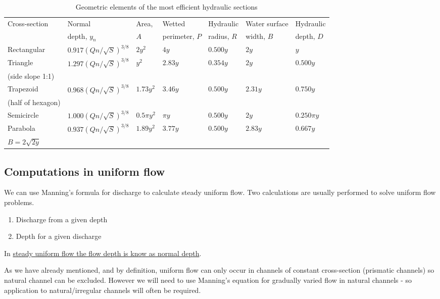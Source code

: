 \documentclass[a4paper, 12pt, british]{article} %
\numberwithin{equation}{section}
\numberwithin{figure}{section}
\numberwithin{table}{section}
\begin{document}
\begin{table}[H]
	\centering
	\begin{tabular}{ l llllll }
		\hline
		Cross-section & Normal & Area,  & Wetted  & Hydraulic  & Water surface  & Hydraulic \\
		& depth, $y_n$ & $A$ & perimeter, $P$ & radius, $R$ &  width, $B$ & depth, $D$\\
		\hline 
		Rectangular & $0.917 (Qn/\sqrt{S})^{3/8}$ & $2y^2$ & $4y$ & $0.500 y$ & $2y$ & $y$\\
		Triangle & $1.297 (Qn/\sqrt{S})^{3/8}$ & $y^2$ & $2.83 y$ & $0.354 y$ & $2y$ & $0.500y$\\
		(side slope 1:1) &  &  &  &  &   & \\
		Trapezoid  & $0.968 (Qn/\sqrt{S})^{3/8}$ & $1.73 y^2$ & $3.46 y$ & $0.500 y$ & $2.31 y$ & $0.750 y$\\
		(half of hexagon)  &  &  &  &  &   & \\
		Semicircle & $1.000 (Qn/\sqrt{S})^{3/8}$ &  $0.5\pi y^2$ & $\pi y$ & $0.500y$ & $2y$ & $0.250 \pi y$ \\
		Parabola  & $0.937 (Qn/\sqrt{S})^{3/8}$ & $1.89 y^2$ & $3.77 y$ & $0.500 y$ & $2.83 y$ & $0.667 y$\\
		$B  =  2\sqrt{2y}$ &  &  &  &  &  &   \\
		\hline
	\end{tabular}
	\caption{Geometric elements of the most efficient
		hydraulic sections \cite{french94}}
	\label{tab:1281}
\end{table}


\subsection{Computations in uniform flow}

We can use Manning's formula for discharge to calculate steady uniform flow. Two calculations are usually performed to solve uniform flow problems.
\begin{enumerate}
	\item Discharge from a given depth
	\item Depth for a given discharge
\end{enumerate}
In \underline{steady uniform flow the flow depth is know as normal depth}.

As we have already mentioned, and by definition, uniform flow can only occur in channels of constant cross-section (prismatic channels) so natural channel can be excluded. However we will need to use Manning's equation for gradually varied flow in natural channels - so application to natural/irregular channels will often be required.
\end{document}

